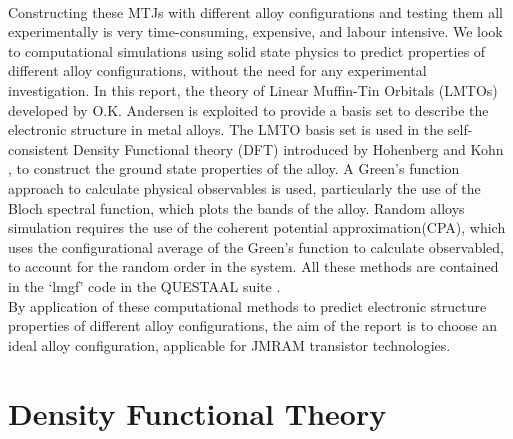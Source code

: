 \documentclass[12pt]{article}
\begin{document}
\\
Constructing these MTJs with different alloy configurations and testing them all experimentally is very time-consuming, expensive, and labour intensive. We look to computational simulations using solid state physics to predict properties of different alloy configurations, without the need for any experimental investigation. In this report, the theory of Linear Muffin-Tin Orbitals (LMTOs) developed by O.K. Andersen \cite{andersen} is exploited to provide a basis set to describe the electronic structure in metal alloys. The LMTO basis set is used in the self-consistent Density Functional theory (DFT) introduced by Hohenberg and Kohn \cite{inhom}, to construct the ground state properties of the alloy. A Green’s function approach to calculate physical observables is used, particularly the use of the Bloch spectral function, which plots the bands of the alloy. Random alloys simulation requires the use of the coherent potential approximation(CPA)\cite{drchal}, which uses the configurational average of the Green's function to calculate observabled, to account for the random order in the system. All these methods are contained in the ‘lmgf’ code in the QUESTAAL suite \cite{ques}.
\\
By application of these computational methods to predict electronic structure properties of different alloy configurations, the aim of the report is to choose an ideal alloy configuration, applicable for JMRAM transistor technologies.

\section{Density Functional Theory}
\end{document}
